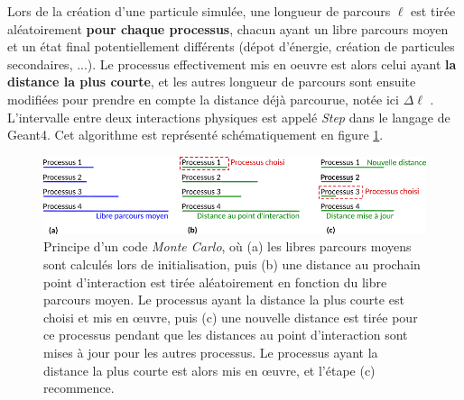 \begin{refsection}
Lors de la création d'une particule simulée, une longueur de parcours $\ell$ est tirée aléatoirement \textbf{pour chaque processus}, chacun ayant un libre parcours moyen et un état final potentiellement différents (dépot d'énergie, création de particules secondaires, ...). Le processus effectivement mis en oeuvre est alors celui ayant \textbf{la distance la plus courte}, et les autres longueur de parcours sont ensuite modifiées pour prendre en compte la distance déjà parcourue, notée ici $\Delta \ell$ \parencite{haghighat_2015}. L'intervalle entre deux interactions physiques est appelé \textit{Step} dans le langage de Geant4. Cet algorithme est représenté schématiquement en figure \ref{fig:4-MC_algo}. 

\begin{figure}[hbtp]
	\centering
	\includegraphics[width=\linewidth]{4-simulation/principe_MC.png}
	\caption{Principe d'un code \textit{Monte Carlo}, où (a) les libres parcours moyens sont calculés lors de initialisation, puis (b) une distance au prochain point d'interaction est tirée aléatoirement en fonction du libre parcours moyen. Le processus ayant la distance la plus courte est choisi et mis en œuvre, puis (c) une nouvelle distance est tirée pour ce processus pendant que les distances au point d'interaction sont mises à jour pour les autres processus. Le processus ayant la distance la plus courte est alors mis en œuvre, et l'étape (c) recommence.}
	\label{fig:4-MC_algo}
\end{figure}


\end{refsection}
